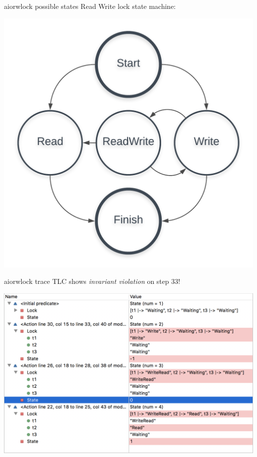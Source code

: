 \documentclass[12pt]{beamer}
\begin{document}
  \begin{frame}{aiorwlock possible states}
      Read Write lock state machine:
      \begin{center}
          \includegraphics[scale=0.15]{figures/task_states2}
      \end{center}
  \end{frame}
  \begin{frame}{aiorwlock trace}
      TLC shows \textit{invariant violation} on step 33!
      \begin{center}
          \includegraphics[scale=0.45]{figures/tla_trace}
      \end{center}
  \end{frame}
\end{document}

